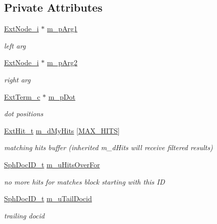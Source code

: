 \subsection*{Private Attributes}
\begin{DoxyCompactItemize}
\item 
\hyperlink{classExtNode__i}{Ext\-Node\-\_\-i} $\ast$ \hyperlink{classExtUnit__c_a26cac752b4ece78ea2cb78bb8ff572e0}{m\-\_\-p\-Arg1}
\begin{DoxyCompactList}\small\item\em left arg \end{DoxyCompactList}\item 
\hyperlink{classExtNode__i}{Ext\-Node\-\_\-i} $\ast$ \hyperlink{classExtUnit__c_a2326eb5df0ab47378ea39c51725206fe}{m\-\_\-p\-Arg2}
\begin{DoxyCompactList}\small\item\em right arg \end{DoxyCompactList}\item 
\hyperlink{classExtTerm__c}{Ext\-Term\-\_\-c} $\ast$ \hyperlink{classExtUnit__c_a48f8a3ee256cd29b1683f39e20af702d}{m\-\_\-p\-Dot}
\begin{DoxyCompactList}\small\item\em dot positions \end{DoxyCompactList}\item 
\hyperlink{structExtHit__t}{Ext\-Hit\-\_\-t} \hyperlink{classExtUnit__c_ae8b27ce86563533dbc48728ef669de10}{m\-\_\-d\-My\-Hits} \mbox{[}\hyperlink{classExtNode__i_a79b81cba51253fdbe56fd3595fac9ab4}{M\-A\-X\-\_\-\-H\-I\-T\-S}\mbox{]}
\begin{DoxyCompactList}\small\item\em matching hits buffer (inherited m\-\_\-d\-Hits will receive filtered results) \end{DoxyCompactList}\item 
\hyperlink{sphinx_8h_a3176771631c12a9e4897272003e6b447}{Sph\-Doc\-I\-D\-\_\-t} \hyperlink{classExtUnit__c_a329f5cee71887a7e7a8188385089ac54}{m\-\_\-u\-Hits\-Over\-For}
\begin{DoxyCompactList}\small\item\em no more hits for matches block starting with this I\-D \end{DoxyCompactList}\item 
\hyperlink{sphinx_8h_a3176771631c12a9e4897272003e6b447}{Sph\-Doc\-I\-D\-\_\-t} \hyperlink{classExtUnit__c_a92ee25f0d59bf056fffc60bb225cb039}{m\-\_\-u\-Tail\-Docid}
\begin{DoxyCompactList}\small\item\em trailing docid \end{DoxyCompactList}\item 

\end{DoxyCompactItemize}
